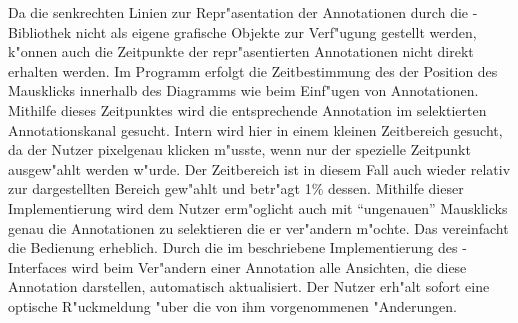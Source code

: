Da die senkrechten Linien zur Repr"asentation der Annotationen durch die \jfcNS-Bibliothek nicht als eigene grafische Objekte zur Verf"ugung gestellt werden, k"onnen auch die Zeitpunkte der repr"asentierten Annotationen nicht direkt erhalten werden.
Im Programm erfolgt die Zeitbestimmung des der Position des Mausklicks innerhalb des Diagramms wie beim Einf"ugen von Annotationen.
Mithilfe dieses Zeitpunktes wird die entsprechende Annotation im selektierten Annotationskanal gesucht.
Intern wird hier in einem kleinen Zeitbereich gesucht, da der Nutzer pixelgenau klicken m"usste, wenn nur der spezielle Zeitpunkt ausgew"ahlt werden w"urde.
Der Zeitbereich ist in diesem Fall auch wieder relativ zur dargestellten Bereich gew"ahlt und betr"agt \unit{1}{\%} dessen.
Mithilfe dieser Implementierung wird dem Nutzer erm"oglicht auch mit "`ungenauen"' Mausklicks genau die Annotationen zu selektieren die er ver"andern m"ochte.
Das vereinfacht die Bedienung erheblich.
Durch die im  beschriebene Implementierung des -Interfaces wird beim Ver"andern einer Annotation alle Ansichten, die diese Annotation darstellen, automatisch aktualisiert.
Der Nutzer erh"alt sofort eine optische R"uckmeldung "uber die von ihm vorgenommenen "Anderungen.


